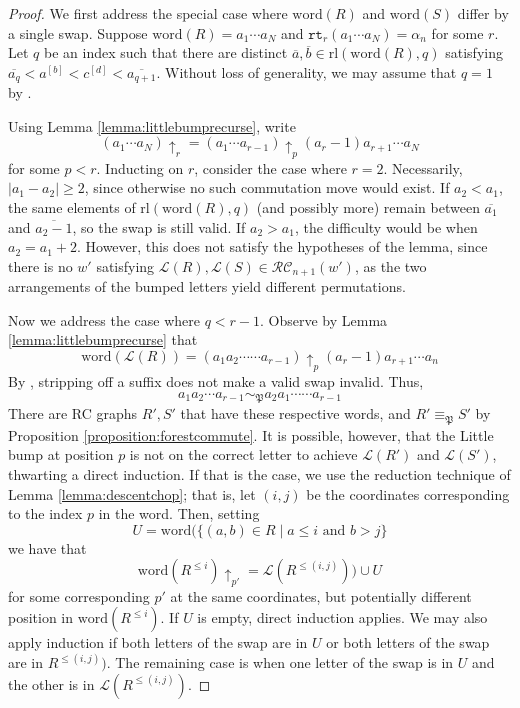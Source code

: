 \documentclass{amsart}
\theoremstyle{definition}
\theoremstyle{remark}
\numberwithin{equation}{subsection}
\newcommand{\rtt}{\mathtt{rt}}
\newcommand{\RC}{\mathcal{RC}}
\newcommand{\lmap}{\mathscr{L}}
\newcommand{\ltb}[2]{#1\!\uparrow_{#2}}
\newcommand{\forest}{\mathfrak{P}}
\begin{document}
\begin{proof}
We first address the special case where $\mathrm{word}(R)$ and $\mathrm{word}(S)$ differ by a single swap. Suppose $\mathrm{word}(R) = a_1\cdots a_N$ and $\rtt_r(a_1\cdots a_N) = \alpha_n$ for some $r$. Let $q$ be an index such that there are distinct $\overline{a},\overline{b}\in\mathrm{rl}(\mathrm{word}(R),q)$ satisfying $\overline{a_q}<a^{[b]}<c^{[d]}<\overline{a_{q+1}}$. Without loss of generality, we may assume that $q=1$ by \cite[Lemma~5.9]{nadeau2023permutahedral}. 

Using Lemma \ref{lemma:littlebumprecurse}, write
$$\ltb{(a_1\cdots a_N)}{r} = \ltb{(a_1\cdots a_{r-1})}{p}(a_r - 1)a_{r+1}\cdots a_N$$
for some $p<r$. Inducting on $r$, consider the case where $r=2$. Necessarily, $|a_1 - a_2|\geq 2$, since otherwise no such commutation move would exist. If $a_2 < a_1$, the same elements of $\mathrm{rl}(\mathrm{word}(R),q)$ (and possibly more) remain between $\overline{a_1}$ and $\overline{a_2-1}$, so the swap is still valid. If $a_2 > a_1$, the difficulty would be when $a_2 = a_1 + 2$. However, this does not satisfy the hypotheses of the lemma, since there is no $w'$ satisfying $\lmap(R),\lmap(S)\in \RC_{n+1}(w')$, as the two arrangements of the bumped letters yield different permutations.


Now we address the case where $q<r-1$. Observe by Lemma \ref{lemma:littlebumprecurse} that
$$\mathrm{word}(\lmap(R)) = \ltb{(a_1a_2\cdots \cdots a_{r-1})}{p}(a_r - 1)a_{r+1}\cdots a_n$$
By \cite[Lemma~5.9]{nadeau2024forest}, stripping off a suffix does not make a valid swap invalid. Thus,
$$a_1a_2\cdots a_{r-1}\sim_\forest a_2a_1\cdots \cdots a_{r-1}$$
There are RC graphs $R',S'$ that have these respective words, and $R'\equiv_\forest S'$ by Proposition \ref{proposition:forestcommute}. It is possible, however, that the Little bump at position $p$ is not on the correct letter to achieve $\lmap(R')$ and $\lmap(S')$, thwarting a direct induction. If that is the case, we use the reduction technique of Lemma \ref{lemma:descentchop}; that is, let $(i,j)$ be the coordinates corresponding to the index $p$ in the word. Then, setting
$$U=\mathrm{word}(\{(a,b)\in R\mid a\leq i\text{ and }b> j\}$$
we have that
  $$\ltb{\mathrm{word}(R^{\leq i})}{p'} = \lmap(R^{\leq(i, j)}))\cup  U$$
for some corresponding $p'$ at the same coordinates, but potentially different position in $\mathrm{word}(R^{\leq i})$. If $U$ is empty, direct induction applies. We may also apply induction if both letters of the swap are in $U$ or both letters of the swap are in $R^{\leq(i, j)})$. The remaining case is when one letter of the swap is in $U$ and the other is in $\lmap(R^{\leq(i, j)})$. 


\end{proof}
\end{document}
